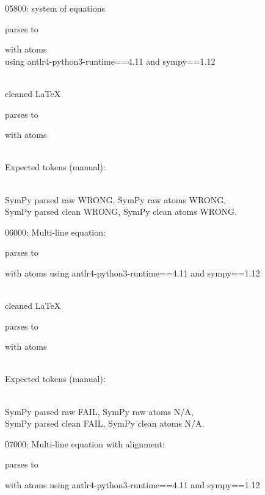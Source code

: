\documentclass{article}
\begin{document}
\hrulefill

05800:
system of equations

parses to

with atoms
\\
using antlr4-python3-runtime==4.11 and sympy==1.12

\ \\
cleaned \LaTeX

parses to

with atoms


\ \\
Expected tokens (manual):


\ \\
SymPy parsed raw WRONG, 
SymPy raw atoms WRONG, \\
SymPy parsed clean WRONG, 
SymPy clean atoms WRONG.

\hrulefill

06000:
Multi-line equation:

parses to

with atoms
using antlr4-python3-runtime==4.11 and sympy==1.12

\ \\
cleaned \LaTeX

parses to

with atoms


\ \\
Expected tokens (manual):


\ \\
SymPy parsed raw FAIL, 
SymPy raw atoms N/A, \\
SymPy parsed clean FAIL, 
SymPy clean atoms N/A.

\hrulefill

07000:
Multi-line equation with alignment:

parses to

with atoms
using antlr4-python3-runtime==4.11 and sympy==1.12
\end{document}
